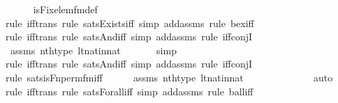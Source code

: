 \begin{isabellebody}
\ \ \ \ \isamarkupfalse%
\ is{\isacharunderscore}{\kern0pt}Fix{\isacharunderscore}{\kern0pt}elem{\isacharunderscore}{\kern0pt}fm{\isacharunderscore}{\kern0pt}def\isanewline
\ \ \ \ \isamarkupfalse%
{\isacharparenleft}{\kern0pt}rule\ iff{\isacharunderscore}{\kern0pt}trans{\isacharcomma}{\kern0pt}\ rule\ sats{\isacharunderscore}{\kern0pt}Exists{\isacharunderscore}{\kern0pt}iff{\isacharcomma}{\kern0pt}\ simp\ add{\isacharcolon}{\kern0pt}assms{\isacharcomma}{\kern0pt}\ rule\ bex{\isacharunderscore}{\kern0pt}iff{\isacharparenright}{\kern0pt}\isanewline
\ \ \ \ \isamarkupfalse%
{\isacharparenleft}{\kern0pt}rule\ iff{\isacharunderscore}{\kern0pt}trans{\isacharcomma}{\kern0pt}\ rule\ sats{\isacharunderscore}{\kern0pt}And{\isacharunderscore}{\kern0pt}iff{\isacharcomma}{\kern0pt}\ simp\ add{\isacharcolon}{\kern0pt}assms{\isacharcomma}{\kern0pt}\ rule\ iff{\isacharunderscore}{\kern0pt}conjI{}{\isacharparenright}{\kern0pt}\isanewline
\ \ \ \ \isamarkupfalse%
\ assms\ nth{\isacharunderscore}{\kern0pt}type\ lt{\isacharunderscore}{\kern0pt}nat{\isacharunderscore}{\kern0pt}in{\isacharunderscore}{\kern0pt}nat\isanewline
\ \ \ \ \ \isamarkupfalse%
\ simp\isanewline
\ \ \ \ \isamarkupfalse%
{\isacharparenleft}{\kern0pt}rule\ iff{\isacharunderscore}{\kern0pt}trans{\isacharcomma}{\kern0pt}\ rule\ sats{\isacharunderscore}{\kern0pt}And{\isacharunderscore}{\kern0pt}iff{\isacharcomma}{\kern0pt}\ simp\ add{\isacharcolon}{\kern0pt}assms{\isacharcomma}{\kern0pt}\ rule\ iff{\isacharunderscore}{\kern0pt}conjI{}{\isacharparenright}{\kern0pt}\isanewline
\ \ \ \ \ \isamarkupfalse%
{\isacharparenleft}{\kern0pt}rule\ sats{\isacharunderscore}{\kern0pt}is{\isacharunderscore}{\kern0pt}Fn{\isacharunderscore}{\kern0pt}perm{\isacharprime}{\kern0pt}{\isacharunderscore}{\kern0pt}fm{\isacharunderscore}{\kern0pt}iff{\isacharparenright}{\kern0pt}\isanewline
\ \ \ \ \isamarkupfalse%
\ assms\ nth{\isacharunderscore}{\kern0pt}type\ lt{\isacharunderscore}{\kern0pt}nat{\isacharunderscore}{\kern0pt}in{\isacharunderscore}{\kern0pt}nat\isanewline
\ \ \ \ \ \ \ \ \ \ \ \ \isamarkupfalse%
\ auto{\isacharbrackleft}{\kern0pt}{}{\isacharbrackright}{\kern0pt}\isanewline
\ \ \ \ \isamarkupfalse%
{\isacharparenleft}{\kern0pt}rule\ iff{\isacharunderscore}{\kern0pt}trans{\isacharcomma}{\kern0pt}\ rule\ sats{\isacharunderscore}{\kern0pt}Forall{\isacharunderscore}{\kern0pt}iff{\isacharcomma}{\kern0pt}\ simp\ add{\isacharcolon}{\kern0pt}assms{\isacharcomma}{\kern0pt}\ rule\ ball{\isacharunderscore}{\kern0pt}iff{\isacharparenright}{\kern0pt}\isanewline

\end{isabellebody}
